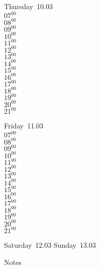 \documentclass[11pt,a4paper]{book}\usepackage[]{graphicx}\usepackage[]{color}
\begin{document}
\clearpage
\begin{headerbox}
\end{headerbox}
\begin{weekdaybox}
  Thursday~10.03\\
  { 
  \vfill
  $07^{00}$\\
$08^{00}$\\
$09^{00}$\\
$10^{00}$\\
$11^{00}$\\
$12^{00}$\\
$13^{00}$\\
$14^{00}$\\
$15^{00}$\\
$16^{00}$\\
$17^{00}$\\
$18^{00}$\\
$19^{00}$\\
$20^{00}$\\
$21^{00}$\\
  }
\end{weekdaybox} 
\begin{weekdaybox}
  Friday~11.03\\
  { 
  \vfill
  $07^{00}$\\
$08^{00}$\\
$09^{00}$\\
$10^{00}$\\
$11^{00}$\\
$12^{00}$\\
$13^{00}$\\
$14^{00}$\\
$15^{00}$\\
$16^{00}$\\
$17^{00}$\\
$18^{00}$\\
$19^{00}$\\
$20^{00}$\\
$21^{00}$\\
  }
\end{weekdaybox}
\begin{weekendbox}
  Saturday~12.03
  \tcblower
  Sunday~13.03
\end{weekendbox} %
\begin{notebox}
  Notes
\end{notebox}
\clearpage
\end{document}
